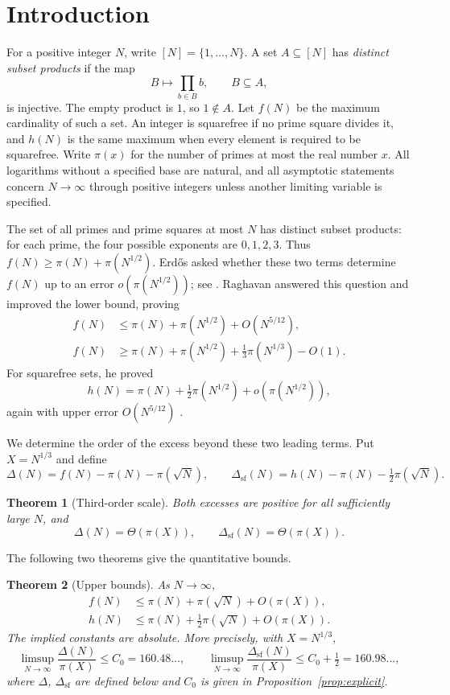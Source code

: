 \documentclass[11pt]{article}
\numberwithin{equation}{section}
\newtheorem{theorem}{Theorem}[section]
\theoremstyle{remark}
\begin{document}
\section{Introduction}
For a positive integer $N$, write $[N]=\{1,\dots,N\}$. A set $A\subseteq[N]$ has \emph{distinct subset products} if the map
\[
B\longmapsto\prod_{b\in B}b,\qquad B\subseteq A,
\]
is injective. The empty product is $1$, so $1\notin A$. Let $f(N)$ be the maximum cardinality of such a set. An integer is squarefree if no prime square divides it, and $h(N)$ is the same maximum when every element is required to be squarefree. Write $\pi(x)$ for the number of primes at most the real number $x$. All logarithms without a specified base are natural, and all asymptotic statements concern $N\to\infty$ through positive integers unless another limiting variable is specified.

The set of all primes and prime squares at most $N$ has distinct subset products: for each prime, the four possible exponents are $0,1,2,3$. Thus $f(N)\ge\pi(N)+\pi(N^{1/2})$. Erd\H{o}s asked whether these two terms determine $f(N)$ up to an error $o(\pi(N^{1/2}))$; see \cite[p.~137]{Erdos}. Raghavan \cite[Theorems 1.3 and 1.4]{Raghavan} answered this question and improved the lower bound, proving
\begin{align*}
f(N)&\le\pi(N)+\pi(N^{1/2})+O(N^{5/12}),\\
f(N)&\ge\pi(N)+\pi(N^{1/2})+\tfrac13\pi(N^{1/3})-O(1).
\end{align*}
For squarefree sets, he proved
\[
h(N)=\pi(N)+\tfrac12\pi(N^{1/2})+o(\pi(N^{1/2})),
\]
again with upper error $O(N^{5/12})$ \cite[Theorems 1.5 and 1.6]{Raghavan}.

We determine the order of the excess beyond these two leading terms. Put $X=N^{1/3}$ and define
\[
\Delta(N)=f(N)-\pi(N)-\pi(\sqrt N),\qquad \Delta_{\mathrm{sf}}(N)=h(N)-\pi(N)-\tfrac12\pi(\sqrt N).
\]

\begin{theorem}[Third-order scale]\label{thm:scale}
Both excesses are positive for all sufficiently large $N$, and
\[
\Delta(N)=\Theta(\pi(X)),\qquad \Delta_{\mathrm{sf}}(N)=\Theta(\pi(X)).
\]
\end{theorem}

The following two theorems give the quantitative bounds.

\begin{theorem}[Upper bounds]\label{thm:upper}
As $N\to\infty$,
\begin{align*}
f(N)&\le\pi(N)+\pi(\sqrt N)+O(\pi(X)),\\
h(N)&\le\pi(N)+\tfrac12\pi(\sqrt N)+O(\pi(X)).
\end{align*}
The implied constants are absolute. More precisely, with $X=N^{1/3}$,
\[
\limsup_{N\to\infty}\frac{\Delta(N)}{\pi(X)}\le C_0=160.48\ldots,\qquad
\limsup_{N\to\infty}\frac{\Delta_{\mathrm{sf}}(N)}{\pi(X)}\le C_0+\tfrac12=160.98\ldots,
\]
where $\Delta$, $\Delta_{\mathrm{sf}}$ are defined below and $C_0$ is given in Proposition~\ref{prop:explicit}.
\end{theorem}
\end{document}
